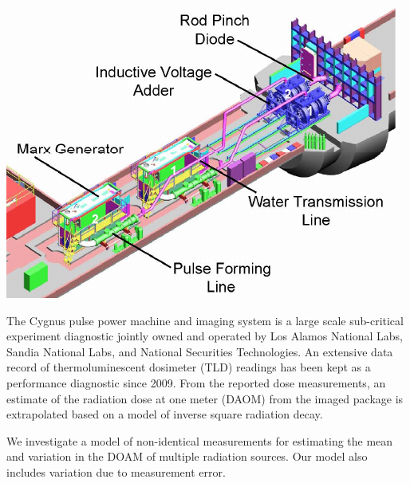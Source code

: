 \documentclass[landscape,a0paper,fontscale=0.285]{baposter} %
\begin{document}
\begin{poster}
{\begin{multicols}{2}
\begin{center}
\includegraphics[width=0.75\linewidth]{cygnus_pulse_side.pdf}
\end{center}

The Cygnus pulse power machine and imaging system is a large scale sub-critical
experiment diagnostic jointly owned and operated by Los Alamos National Labs,
Sandia National Labs, and National Securities Technologies.  An extensive data
record of thermoluminescent dosimeter (TLD) readings has been kept as a 
performance diagnostic since 2009.  From the reported dose measurements, an estimate of the radiation dose
at one meter (DAOM) from the imaged package is extrapolated based on a model of
inverse square radiation decay. 


We investigate a model of non-identical measurements for estimating the mean and variation in
the DOAM of multiple radiation sources.  Our model also includes variation due to measurement error. 


\end{multicols}}
\end{poster}
\end{document}
